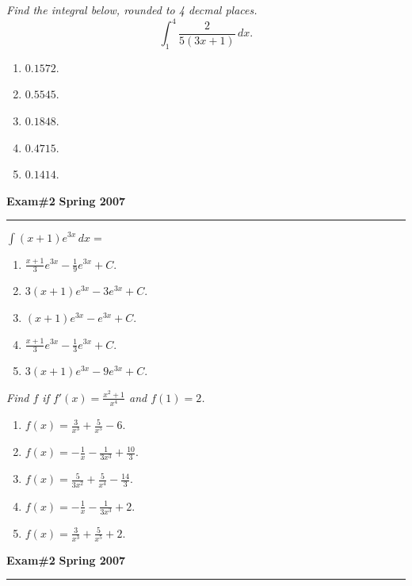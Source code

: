 \documentclass[12pt]{article}
\begin{document}
{\problem \em Find the integral below, rounded to 4 decmal places.
  \begin{equation*}
    \int_1^4 \frac{2}{5(3x+1)}\, dx.
  \end{equation*}}
\begin{enumerate}
\item $0.1572$.
\item $0.5545$.
\item $0.1848$.
\item $0.4715$.
\item $0.1414$.
\end{enumerate}
\newpage

\hfill{\large\bf Exam\#2}\hfill{\large\bf
  Spring 2007}\hrule
\bigskip

{\problem $\displaystyle{\int (x+1) e^{3x}\, dx} = $}
\begin{enumerate}
\item $\displaystyle{\frac{x+1}{3} e^{3x} - \frac{1}{9} e^{3x} + C}$.
\item $\displaystyle{3 (x+1) e^{3x} - 3 e^{3x} + C}$.
\item $\displaystyle{(x+1) e^{3x} - e^{3x} + C}$.
\item $\displaystyle{\frac{x+1}{3} e^{3x} - \frac{1}{3} e^{3x} + C}$.
\item $\displaystyle{3 (x+1) e^{3x} - 9 e^{3x} + C}$.
\end{enumerate}
\vspace{4cm}

{\problem \em Find $f$ if $f'(x) = \displaystyle{\frac{x^2+1}{x^4}}$
  and $f(1)=2$.}
\begin{enumerate}
\item $\displaystyle{f(x) = \frac{3}{x^3} + \frac{5}{x^5} -6}$.
\item $\displaystyle{f(x) = -\frac{1}{x} - \frac{1}{3x^3} +
    \frac{10}{3}}$.
\item $\displaystyle{f(x) = \frac{5}{3x^2} + \frac{5}{x^4} -
    \frac{14}{3}}$.
\item $\displaystyle{f(x) = -\frac{1}{x} - \frac{1}{3x^3} +2}$.
\item $\displaystyle{f(x) = \frac{3}{x^3} + \frac{5}{x^5} +2}$.
\end{enumerate}
\newpage

\hfill{\large\bf Exam\#2}\hfill{\large\bf
  Spring 2007}\hrule 
\bigskip
\end{document}
